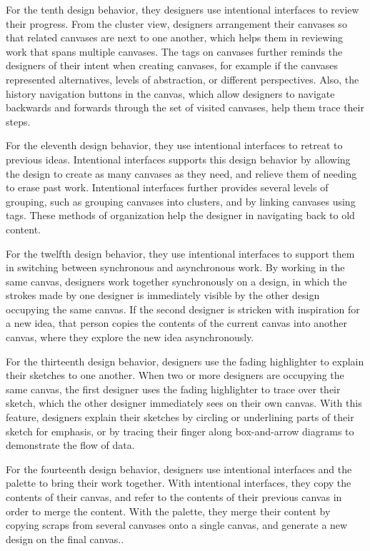 \documentclass[12pt,fleqn]{ucithesis}
\begin{document}
For the tenth design behavior, they designers use intentional interfaces to review their progress. From the cluster view, designers arrangement their canvases so that related canvases are next to one another, which helps them in reviewing work that spans multiple canvases. The tags on canvases further reminds the designers of their intent when creating canvases, for example if the canvases represented alternatives, levels of abstraction, or different perspectives. Also, the history navigation buttons in the canvas, which allow designers to navigate backwards and forwards through the set of visited canvases, help them trace their steps.

For the eleventh design behavior, they use intentional interfaces to retreat to previous ideas. Intentional interfaces supports this design behavior by allowing the design to create as many canvases as they need, and relieve them of needing to erase past work. Intentional interfaces further provides several levels of grouping, such as grouping canvases into clusters, and by linking canvases using tags. These methods of organization help the designer in navigating back to old content.

For the twelfth design behavior, they use intentional interfaces to support them in switching between synchronous and asynchronous work. By working in the same canvas, designers work together synchronously on a design, in which the strokes made by one designer is immediately visible by the other design occupying the same canvas. If the second designer is stricken with inspiration for a new idea, that person copies the contents of the current canvas into another canvas, where they explore the new idea asynchronously.

For the thirteenth design behavior, designers use the fading highlighter to explain their sketches to one another. When two or more designers are occupying the same canvas, the first designer uses the fading highlighter to trace over their sketch, which the other designer immediately sees on their own canvas. With this feature, designers explain their sketches by circling or underlining parts of their sketch for emphasis, or by tracing their finger along box-and-arrow diagrams to demonstrate the flow of data.

For the fourteenth design behavior, designers use intentional interfaces and the palette to bring their work together. With intentional interfaces, they copy the contents of their canvas, and refer to the contents of their previous canvas in order to merge the content. With the palette, they merge their content by copying scraps from several canvases onto a single canvas, and generate a new design on the final canvas..
\end{document}
